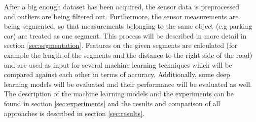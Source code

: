 After a big enough dataset has been acquired, the sensor data is preprocessed and outliers are being filtered out. Furthermore, the sensor measurements are being segmented, so that measurements belonging to the same object (e.g parking car) are treated as one segment. This process will be described in more detail in section  \ref{sec:segmentation}. Features on the given segments are calculated (for example the length of the segments and the distance to the right side of the road) and are used as input for several machine learning techniques which will be compared against each other in terms of accuracy. Additionally, some deep learning models will be evaluated and their performance will be evaluated as well. The description of the machine learning  models and the experiments can be found in section  \ref{sec:experiments} and the results and comparison of all approaches is described in section  \ref{sec:results}. 


